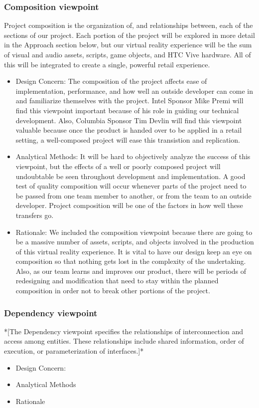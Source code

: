 \documentclass[10pt,journal,compsoc,onecolumn, draftclsnofoot]{IEEEtran}
\begin{document}
\subsubsection{Composition viewpoint}
Project composition is the organization of, and relationships between, each of
the sections of our project. Each portion of the project will be explored in
more detail in the Approach section below, but our virtual reality experience
will be the sum of visual and audio assets, scripts, game objects, and HTC Vive
hardware. All of this will be integrated to create a single, powerful retail
experience.
\begin{itemize}
  \item Design Concern: The composition of the project affects ease of
  implementation, performance, and how well an outside developer can come in
  and familiarize themselves with the project. Intel Sponsor Mike Premi will
  find this viewpoint important because of his role in guiding our technical
  development. Also, Columbia Sponsor Tim Devlin will find this viewpoint
  valuable because once the product is handed over to be applied in a retail
  setting, a well-composed project will ease this transistion and replication.
  \item Analytical Methods: It will be hard to objectively analyze the success
  of this viewpoint, but the effects of a well or poorly composed project will
  undoubtable be seen throughout development and implementation. A good test of
  quality composition will occur whenever parts of the project need to be
  passed from one team member to another, or from the team to an outside
  developer. Project composition will be one of the factors in how well these
  transfers go.
  \item Rationale: We included the composition viewpoint because there are
  going to be a massive number of assets, scripts, and objects involved in the
  production of this virtual reality experience. It is vital to have our design
  keep an eye on composition so that nothing gets lost in the complexity of the
  undertaking. Also, as our team learns and improves our product, there will be
  periods of redesigning and modification that need to stay within the planned
  composition in order not to break other portions of the project.
\end{itemize}

\subsubsection{Dependency viewpoint}
*[The Dependency viewpoint specifies the relationships of interconnection and access among entities. These relationships include shared information, order of execution, or parameterization of interfaces.]*
\begin{itemize}
  \item Design Concern:
  \item Analytical Methods
  \item Rationale
\end{itemize}
\end{document}
